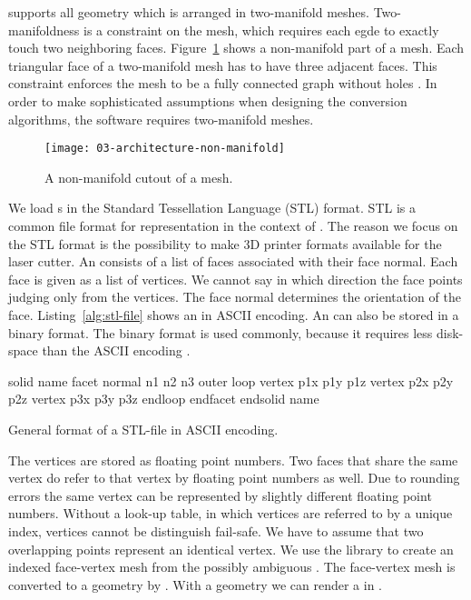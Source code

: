 \documentclass[../../ClassicThesis.tex]{subfiles}
\begin{document}
{\platener} supports all geometry which is arranged in two-manifold
meshes. Two-manifoldness is a constraint on the mesh, which requires
each egde to exactly touch two neighboring faces.
Figure~\ref{fig:non-manifold} shows a non-manifold part of a mesh.
Each triangular face of a two-manifold mesh has to have three adjacent
faces. This constraint enforces the mesh to be a fully connected graph
without holes \cite[p.~28]{master-thesis}. In order to make
sophisticated assumptions when designing the conversion algorithms,
the software requires two-manifold meshes.

\begin{figure}[h]
  \centering
  \texttt{[image: 03-architecture-non-manifold]}
  \caption{A non-manifold cutout of a mesh.}
  \label{fig:non-manifold}
\end{figure}

We load {\threedmodel}s in the Standard Tessellation
Language (STL) format. STL is a common file format for
{\threedmodel} representation in the context of
{\threedprinting}. The reason we focus on the STL format is
the possibility to make 3D printer formats available for the
laser cutter. An {\stlfile} consists of a list of faces
associated with their face normal. Each face is given as a
list of vertices. We cannot say in which direction the face
points judging only from the vertices. The face normal
determines the orientation of the face.
Listing~\ref{alg:stl-file} shows an {\stlfile} in ASCII
encoding. An {\stlfile} can also be stored in a binary
format. The binary format is used commonly, because it
requires less disk-space than the ASCII encoding
\cite[p.~8]{stl-file}.

\begin{listing}
\begin{CVerbatim}
solid name
 facet normal n1 n2 n3
  outer loop
  vertex p1x p1y p1z
  vertex p2x p2y p2z
  vertex p3x p3y p3z
  endloop
 endfacet
endsolid name
\end{CVerbatim}
\caption{General format of a STL-file in ASCII encoding.}
\label{alg:stl-file}
\end{listing}

The vertices are stored as floating point numbers. Two faces
that share the same vertex do refer to that vertex by
floating point numbers as well. Due to rounding errors the
same vertex can be represented by slightly different
floating point numbers. Without a look-up table, in which
vertices are referred to by a unique index, vertices cannot
be distinguish fail-safe. We have to assume that two
overlapping points represent an identical vertex. We use the
library {\meshlib} to create an indexed face-vertex mesh
from the possibly ambiguous {\stlfile}. The face-vertex mesh
is converted to a {\threejs} geometry by {\meshlib}. With a
{\threejs} geometry we can render a {\threedmodel} in
{\convertify}.
\end{document}
